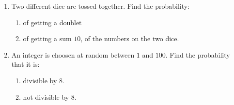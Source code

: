 \begin{enumerate}
	\item Two different dice are tossed together. Find the probability:

		\begin{enumerate}[label=(\roman*)]
	\item of getting a doublet
	\item of getting a sum $10$, of the numbers on the two dice.
\end{enumerate}
\item An integer is choosen at random between $1$ and $100$. Find the probability that it is: 

	\begin{enumerate}[label=(\roman*)]
		\item divisible by $8$.
		\item not divisible by $8$.
	\end{enumerate}
\end{enumerate}